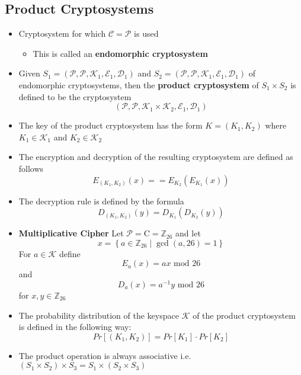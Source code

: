 \subsection{Product Cryptosystems}
\begin{itemize}
  \item Cryptosystem for which $\mathcal C = \mathcal P$ is used
  \begin{itemize}
  	\item This is called an \textbf{endomorphic cryptosystem}
  \end{itemize}
  \item Given $S_1 = (\mathcal P, \mathcal P, \mathcal K_1, \mathcal E_1, \mathcal D_1)$ and $S_2 = (\mathcal P, \mathcal P, \mathcal K_1, \mathcal E_1, \mathcal D_1)$ of endomorphic cryptosystems, then the \textbf{product cryptosystem} of $S_1 \times S_2$ is defined to be the cryptosystem
  \begin{equation*}
    (\mathcal P, \mathcal P, \mathcal K_1 \times \mathcal K_2, \mathcal E_1, \mathcal D_1)
  \end{equation*}
  \item The key of the product cryptosystem has the form $K=(K_1, K_2)$ where $K_1 \in \mathcal K_1$ and $K_2 \in \mathcal K_2$
  \item The encryption and decryption of the resulting cryptosystem are defined as follows
  \begin{equation*}
    E_{(K_1, K_2)}(x) = = E_{K_2}(E_{K_1}(x))
  \end{equation*}
  \item The decryption rule is defined by the formula
  \begin{equation*}
    D_{(K_1,K_2)}(y) = D_{K_1}(D_{K_2}(y))
  \end{equation*} 
  \item \textbf{Multiplicative Cipher} Let $\mathcal{P}=\mathrm{C}=\mathbb{Z}_{26}$ and let
  $$
    x=\left\{a \in \mathbb{Z}_{26} \mid \operatorname{gcd}(a, 26)=1\right\}
  $$
  For $a \in \mathcal{K}$ define
  $$
    E_a(x) = ax \text{ mod } 26
  $$  
  and
  $$
    D_a(x) = a^{-1} y \text{ mod } 26
  $$
  for $x,y \in \mathbb Z_{26}$ 
  \item The probability distribution of the keyspace $\mathcal K$ of the product cryptosystem is defined in the following way:
  \begin{equation*}
    Pr[(K_1, K_2)] = Pr[K_1] \cdot Pr[K_2]
  \end{equation*}
  \item The product operation is always associative i.e. $(S_1 \times S_2) \times S_3 = S_1 \times (S_2 \times S_3)$

\end{itemize}
